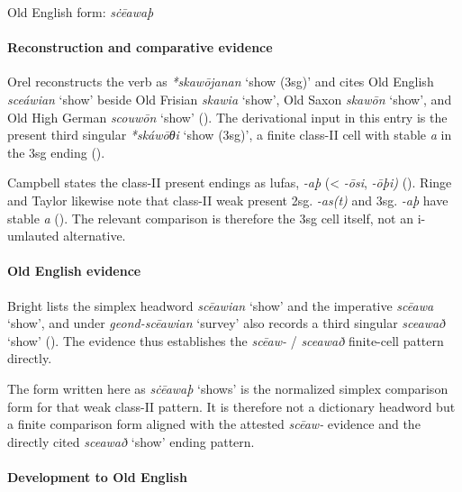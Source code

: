 \documentclass[
  british,
  a4paper,
]{article}
\providecommand{\Recon}[1]{\emph{*#1}}
\begin{document}
Old English form: \emph{sċēawaþ}

\paragraph{Reconstruction and comparative
evidence}\label{reconstruction-and-comparative-evidence-143}

Orel reconstructs the verb as \Recon{skawōjanan} `show (3sg)' and cites
Old English {\emph{sceáwian}} `show' beside Old Frisian {\emph{skawia}}
`show', Old Saxon {\emph{skawōn}} `show', and Old High German
{\emph{scouwōn}} `show' (). The
derivational input in this entry is the present third singular
\Recon{skáwōθi} `show (3sg)', a finite class-II cell with stable
\emph{a} in the 3sg ending ().

Campbell states the class-II present endings as lufas, \emph{-aþ}
(\textless{} \emph{-ōsi}, \emph{-ōþi)}
(). Ringe and
Taylor likewise note that class-II weak present 2sg. \emph{-as(t)} and
3sg. \emph{-aþ} have stable \emph{a}
(). The
relevant comparison is therefore the 3sg cell itself, not an i-umlauted
alternative.

\paragraph{Old English evidence}\label{old-english-evidence-143}

Bright lists the simplex headword {\emph{scēawian}} `show' and the
imperative {\emph{scēawa}} `show', and under \emph{geond-scēawian}
`survey' also records a third singular \emph{sceawað} `show'
(). The
evidence thus establishes the \emph{scēaw-} / \emph{sceawað} finite-cell
pattern directly.

The form written here as {\emph{sċēawaþ}} `shows' is the normalized
simplex comparison form for that weak class-II pattern. It is therefore
not a dictionary headword but a finite comparison form aligned with the
attested \emph{scēaw-} evidence and the directly cited \emph{sceawað}
`show' ending pattern.

\paragraph{Development to Old
English}\label{development-to-old-english-143}
\end{document}
